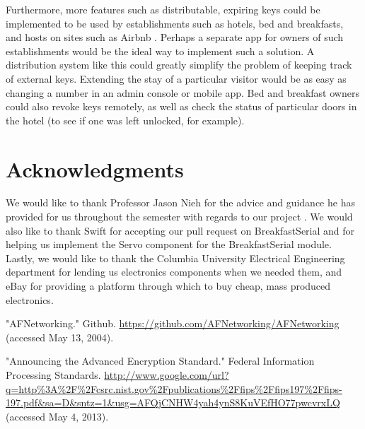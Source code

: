 \documentclass[10pt]{article}
\begin{document}
\begin{multicols}{2}
Furthermore, more features such as distributable, expiring keys could be implemented to be used by establishments such as hotels, bed and breakfasts, and hosts on sites such as Airbnb \cite{airbnb}. Perhaps a separate app for owners of such establishments would be the ideal way to implement such a solution. A distribution system like this could greatly simplify the problem of keeping track of external keys. Extending the stay of a particular visitor would be as easy as changing a number in an admin console or mobile app. Bed and breakfast owners could also revoke keys remotely, as well as check the status of particular doors in the hotel (to see if one was left unlocked, for example).\\


\section{Acknowledgments}
We would like to thank Professor Jason Nieh for the advice and guidance he has provided for us throughout the semester with regards to our project \cite{nieh}. We would also like to thank Swift \cite{swift} for accepting our pull request on BreakfastSerial and for helping us implement the Servo component for the BreakfastSerial module. Lastly, we would like to thank the Columbia University Electrical Engineering department for lending us electronics components when we needed them, and eBay for providing a platform through which to buy cheap, mass produced electronics. 






\begin{thebibliography}{99} %
  
  "AFNetworking." Github. \url{https://github.com/AFNetworking/AFNetworking} (accessed May 13, 2004).

"Announcing the Advanced Encryption Standard." Federal Information Processing Standards. \url{http://www.google.com/url?q=http\%3A\%2F\%2Fcsrc.nist.gov\%2Fpublications\%2Ffips\%2Ffips197\%2Ffips-197.pdf&sa=D&sntz=1&usg=AFQjCNHW4yah4ynS8KuVEfHO77pwcvrxLQ} (accessed May 4, 2013).


\end{thebibliography}
\end{multicols}
\end{document}
